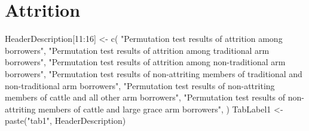 \section{Attrition}

\begin{Schunk}
\begin{Sinput}
HeaderDescription[11:16] <- c(
   "Permutation test results of attrition among borrowers", 
     "Permutation test results of attrition among traditional arm borrowers",
     "Permutation test results of attrition among non-traditional arm borrowers",
     "Permutation test results of non-attriting members of traditional and non-traditional arm borrowers",
     "Permutation test results of non-attriting members of cattle and all other arm borrowers",
     "Permutation test results of non-attriting members of cattle and large grace arm borrowers",
    )
TabLabel1 <- paste("tab1", HeaderDescription)
\end{Sinput}
\end{Schunk}

